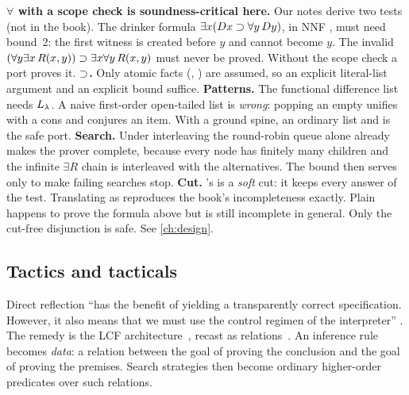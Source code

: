 {\begin{kanren}
\textbf{$\forall$ with a scope check is soundness-critical here.} Our notes derive two tests (not in the
book). The drinker formula $\exists x(D x\supset\forall y\,D y)$, in NNF
, must need bound~2: the first witness is created before $y$ and
cannot become $y$. The invalid $(\forall y\exists x\,R(x,y))\supset\exists x\forall y\,R(x,y)$ must never be
proved. Without the scope check a port proves it. \textbf{$\supset$.} Only atomic facts (, )
are assumed, so an explicit literal-list argument and an explicit bound suffice. \textbf{Patterns.} The
functional difference list needs $L_\lambda$. A naive first-order open-tailed list is \emph{wrong}: popping an
empty  unifies  with a cons and conjures an item. With a ground spine, an ordinary list
and  is the safe port. \textbf{Search.} Under interleaving the round-robin queue alone already
makes the prover complete, because every node has finitely many children and the infinite $\exists R$ chain
is interleaved with the  alternatives. The bound then serves only to make failing searches
stop. \textbf{Cut.} \micro{}'s  is a \emph{soft} cut: it keeps every answer of the test. Translating
\lp{!} as  reproduces the book's incompleteness exactly. Plain 
happens to prove the formula above but is still incomplete in general. Only the cut-free disjunction is
safe. See \cref{ch:design}.
\end{kanren}

\subsection{Tactics and tacticals}\label{sec:apps-tactics}

Direct reflection ``has the benefit of yielding a transparently correct specification. However, it also
means that we must use the control regimen of the interpreter'' . The remedy is the LCF
architecture~\cite{GordonMilnerWadsworth1979}, recast as relations~\cite{FeltyMiller1988,Felty1993}. An
inference rule becomes \emph{data}: a relation between the goal of proving the conclusion and the goal of
proving the premises. Search strategies then become ordinary higher-order predicates over such relations.

}
